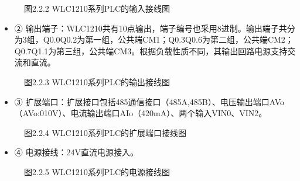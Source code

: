 \documentclass[a4paper,10pt,english]{sphinxmanual}
\begin{document}
\begin{figure}[htbp]
\centering
\capstart

\noindent{}
\caption{图2.2.2  WLC\sphinxhyphen{}1210系列PLC的输入接线图}\label{\detokenize{Product_Overview:id13}}\end{figure}
\begin{itemize}
\item {} 
\sphinxAtStartPar
② 输出端子：WLC\sphinxhyphen{}1210共有10点输出，端子编号也采用8进制。输出端子共分为3组，Q0.0\sphinxhyphen{}Q0.2为第一组，公共端CM1；Q0.3\sphinxhyphen{}Q0.6为第二组，公共端CM2；Q0.7\sphinxhyphen{}Q1.1为第三组，公共端CM3。根据负载性质不同，其输出回路电源支持交流和直流。

\end{itemize}

\begin{figure}[htbp]
\centering
\capstart

\noindent{}
\caption{图2.2.3  WLC\sphinxhyphen{}1210系列PLC的输出接线图}\label{\detokenize{Product_Overview:id14}}\end{figure}
\begin{itemize}
\item {} 
\sphinxAtStartPar
③ 扩展端口：扩展接口包括485通信接口（485A,485B）、电压输出端口AVo（AVo:0\sphinxhyphen{}10V）、电流输出端口AIo（4\sphinxhyphen{}20mA）、两个输入VIN0、VIN2。

\end{itemize}

\begin{figure}[htbp]
\centering
\capstart

\noindent{}
\caption{图2.2.4  WLC\sphinxhyphen{}1210系列PLC的扩展端口接线图}\label{\detokenize{Product_Overview:id15}}\end{figure}
\begin{itemize}
\item {} 
\sphinxAtStartPar
④ 电源接线：24V直流电源接入。

\end{itemize}

\begin{figure}[htbp]
\centering
\capstart

\noindent{}
\caption{图2.2.5  WLC\sphinxhyphen{}1210系列PLC的电源接线图}\label{\detokenize{Product_Overview:id16}}\end{figure}
\end{document}
